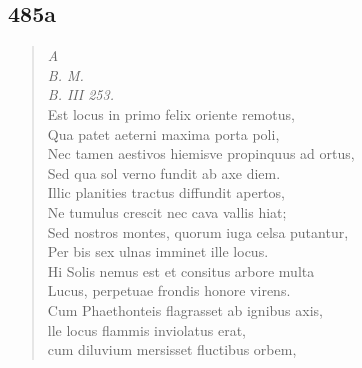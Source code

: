 \documentclass[11pt, a4paper]{report}
\begin{document}
            \subsection*{485a}
      \begin{verse}
      \textit{A} \\ \textit{B. M.} \\ \textit{B. III 253.} \\ Est locus in primo felix oriente remotus, \\ Qua patet aeterni maxima porta poli, \\ Nec tamen aestivos hiemisve propinquus ad ortus, \\ Sed qua sol verno fundit ab axe diem. \\ Illic planities tractus diffundit apertos, \\ Ne tumulus crescit nec cava vallis hiat; \\ Sed nostros montes, quorum iuga celsa putantur, \\ Per bis sex ulnas imminet ille locus. \\ Hi Solis nemus est et consitus arbore multa \\ Lucus, perpetuae frondis honore virens. \\ Cum Phaethonteis flagrasset ab ignibus axis, \\ lle locus flammis inviolatus erat, \\ cum diluvium mersisset fluctibus orbem, \\ 
      \end{verse}
  
\end{document}
